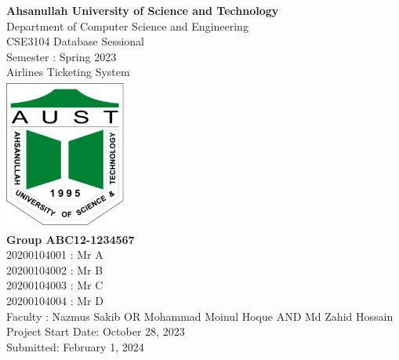 \begin{titlepage}
\begin{center}
\Large  \textbf{Ahsanullah University of Science and Technology}\\
Department of Computer Science and Engineering\\
CSE3104 Database Sessional\\
Semester : Spring 2023\\
\vspace{5pt}
\huge Airlines Ticketing System\\
\vspace{14pt}
\includegraphics[width=4cm, height=5cm]{images/aust.png}\\
\vspace{5pt}
\large \textbf{Group ABC12-1234567} \\
20200104001 : Mr A\\
20200104002 : Mr B\\
20200104003 : Mr C\\
20200104004 : Mr D\\

\vspace{15pt}
Faculty : Nazmus Sakib OR Mohammad Moinul Hoque AND Md Zahid Hossain\\
\vspace{8pt}
Project Start Date: October 28, 2023 \\
Submitted: February 1, 2024 \\
\end{center}
\end{titlepage}



